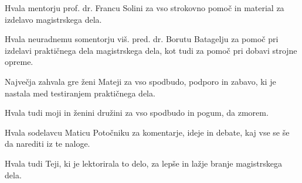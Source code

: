 Hvala mentorju prof. dr. Francu Solini za vso strokovno pomoč in material za izdelavo magistrskega dela.

Hvala neuradnemu somentorju viš. pred. dr. Borutu Batagelju za pomoč pri izdelavi praktičnega dela magistrskega dela, kot tudi za pomoč pri dobavi strojne opreme.

Največja zahvala gre ženi Mateji za vso spodbudo, podporo in zabavo, ki je nastala med testiranjem praktičnega dela.

Hvala tudi moji in ženini družini za vso spodbudo in pogum, da zmorem.

Hvala sodelavcu Maticu Potočniku za komentarje, ideje in debate, kaj vse se še da narediti iz te naloge.

Hvala tudi Teji, ki je lektorirala to delo, za lepše in lažje branje magistrskega dela.
